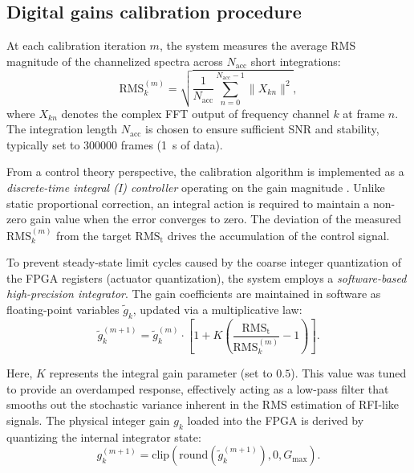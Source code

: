\subsection{Digital gains calibration procedure}
\label{sec:digital_gain_calibration}
At each calibration iteration $m$, the system measures the average RMS magnitude of the channelized spectra across $N_{\mathrm{acc}}$ short integrations:
\begin{equation}
    \text{RMS}_k^{(m)} = \sqrt{\frac{1}{N_{\mathrm{acc}}} \sum_{n=0}^{N_{\mathrm{acc}}-1} \lVert X_{kn} \rVert^2},
\end{equation}
where $X_{kn}$ denotes the complex FFT output of frequency channel $k$ at frame $n$. The integration length $N_{\mathrm{acc}}$ is chosen to ensure sufficient SNR and stability, typically set to \num{300000} frames (\SI{1}{\second} of data).

From a control theory perspective, the calibration algorithm is implemented as a \emph{discrete-time integral (I) controller} operating on the gain magnitude \citep[see][Section~3.3]{franklin1998digital}. Unlike static proportional correction, an integral action is required to maintain a non-zero gain value when the error converges to zero. The deviation of the measured $\text{RMS}_k^{(m)}$ from the target $\text{RMS}_\mathrm{t}$ drives the accumulation of the control signal.

To prevent steady-state limit cycles caused by the coarse integer quantization of the FPGA registers (actuator quantization), the system employs a \textit{software-based high-precision integrator}. The gain coefficients are maintained in software as floating-point variables $\tilde{g}_k$, updated via a multiplicative law:
\begin{equation}
    \tilde{g}_k^{(m+1)} = \tilde{g}_k^{(m)} \cdot \left[ 1 + K \left( \frac{\text{RMS}_\mathrm{t}}{\text{RMS}_k^{(m)}} - 1 \right) \right].
\end{equation}

Here, $K$ represents the integral gain parameter (set to $0.5$). This value was tuned to provide an overdamped response, effectively acting as a low-pass filter that smooths out the stochastic variance inherent in the RMS estimation of RFI-like signals. The physical integer gain $g_k$ loaded into the FPGA is derived by quantizing the internal integrator state:
\begin{equation}
    g_k^{(m+1)} = \text{clip}\left( \text{round}\left( \tilde{g}_k^{(m+1)} \right), 0, G_{\mathrm{max}} \right).
\end{equation}


